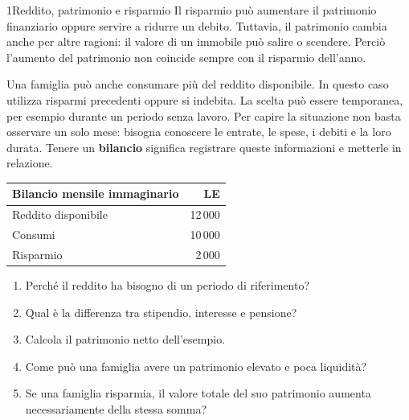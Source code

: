 \begin{lettura}{1}{Reddito, patrimonio e risparmio}
Il risparmio può aumentare il patrimonio finanziario oppure servire a ridurre un debito. Tuttavia, il patrimonio cambia anche per altre ragioni: il valore di un immobile può salire o scendere. Perciò l'aumento del patrimonio non coincide sempre con il risparmio dell'anno.

Una famiglia può anche consumare più del reddito disponibile. In questo caso utilizza risparmi precedenti oppure si indebita. La scelta può essere temporanea, per esempio durante un periodo senza lavoro. Per capire la situazione non basta osservare un solo mese: bisogna conoscere le entrate, le spese, i debiti e la loro durata. Tenere un \textbf{bilancio} significa registrare queste informazioni e metterle in relazione.



\begin{center}\begin{minipage}{\linewidth}\centering\small
\begin{tabular}{lr}\toprule
Bilancio mensile immaginario & LE\\\midrule
Reddito disponibile & 12\,000\\
Consumi & 10\,000\\\midrule
Risparmio & 2\,000\\\bottomrule
\end{tabular}
\end{minipage}\end{center}


\attivita
\begin{enumerate}

\item Perché il reddito ha bisogno di un periodo di riferimento?

\item Qual è la differenza tra stipendio, interesse e pensione?

\item Calcola il patrimonio netto dell’esempio.

\item Come può una famiglia avere un patrimonio elevato e poca liquidità?

\item Se una famiglia risparmia, il valore totale del suo patrimonio aumenta necessariamente della stessa somma?

\end{enumerate}
\lessico



\end{lettura}
